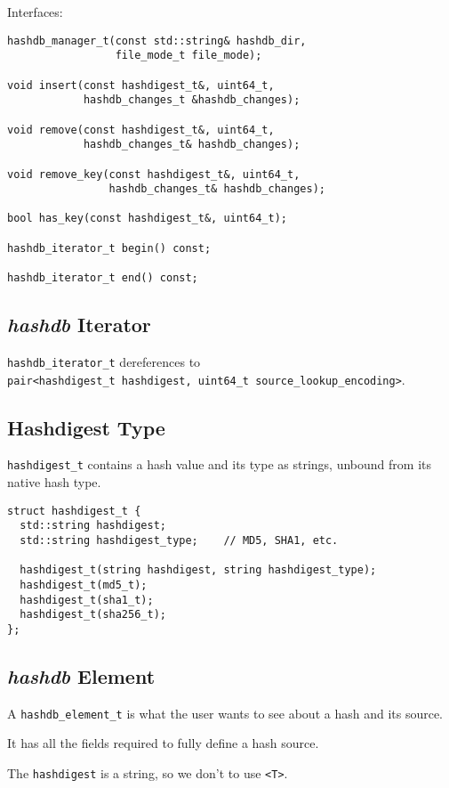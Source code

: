 \documentclass[12pt,twoside]{article}
\newcommand{\hdb}{\emph{hashdb}\xspace}
\begin{document}
Interfaces:

\begin{small}
\begin{verbatim}
hashdb_manager_t(const std::string& hashdb_dir,
                 file_mode_t file_mode);

void insert(const hashdigest_t&, uint64_t, 
            hashdb_changes_t &hashdb_changes);

void remove(const hashdigest_t&, uint64_t, 
            hashdb_changes_t& hashdb_changes);

void remove_key(const hashdigest_t&, uint64_t, 
                hashdb_changes_t& hashdb_changes);

bool has_key(const hashdigest_t&, uint64_t);

hashdb_iterator_t begin() const;

hashdb_iterator_t end() const;
\end{verbatim}
\end{small}

\subsection{\hdb Iterator}
\texttt{hashdb\_iterator\_t} dereferences to \\
\texttt{pair<hashdigest\_t hashdigest, uint64\_t source\_lookup\_encoding>}.

\subsection{Hashdigest Type}
\texttt{hashdigest\_t} contains a hash value and its type
as strings, unbound from its native hash type.
\begin{small}
\begin{verbatim}
struct hashdigest_t {
  std::string hashdigest;
  std::string hashdigest_type;    // MD5, SHA1, etc.

  hashdigest_t(string hashdigest, string hashdigest_type);
  hashdigest_t(md5_t);
  hashdigest_t(sha1_t);
  hashdigest_t(sha256_t);
};
\end{verbatim}
\end{small}

\subsection{\hdb Element}
A \texttt{hashdb\_element\_t} is what the user wants to see
about a hash and its source.
\begin{compactitem}
\item It has all the fields required to fully define a hash source.
\item The \texttt{hashdigest} is a string, so we don't to use \texttt{<T>}.
\end{compactitem}
\end{document}
